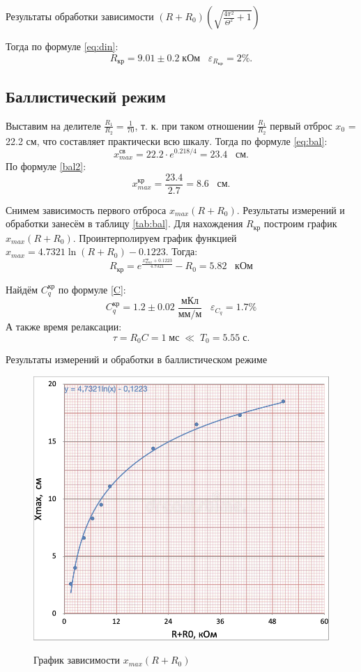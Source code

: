\documentclass[12pt,a4paper]{article}
\begin{document}
\begin{table}[H]
	\caption{Результаты обработки зависимости $(R+R_0)\left(\sqrt{\frac{4\pi^2}{\Theta^2} + 1}\right)$}
	
	\label{table:mnk1}
\end{table}

Тогда по формуле \ref{eq:din}: 
    $$ R_\text{кр} = 9.01 \pm 0.2\; \text{кОм} \;\;\; \varepsilon_{R_\text{кр}} = 2\%. $$


\subsection*{Баллистический режим}

Выставим на делителе $\frac{R_1}{R_2} = \frac{1}{70}$, т. к. при таком отношении $\frac{R_1}{R_2}$ первый отброс $x_0$ = 22.2 см, что составляет практически всю шкалу. Тогда по формуле \ref{eq:bal}:
$$x_{max}^\text{св} = 22.2 \cdot e^{0.218/4} = 23.4 \;\;\; \text{см}.$$
По формуле  \ref{bal2}: $$x_{max}^\text{кр}=\frac{23.4}{2.7}=8.6 \;\;\; \text{см}.$$

Снимем зависимость первого отброса $x_{max}\left(R+R_0\right)$. Результаты измерений и обработки занесём в таблицу \ref{tab:bal}. Для нахождения $R_\text{кр}$ построим график $x_{max}\left(R+R_0\right)$. 
Проинтерполируем график функцией $x_{max}=4.7321 \ln(R+R_0)-0.1223$. Тогда:
$$R_\text{кр}=e^{\frac{x_{max}^\text{кр}+0.1223}{4.7321}}-R_0=5.82 \;\;\; \text{кОм}$$

Найдём $C_q^\text{кр}$ по формуле \ref{C}:
$$C_q^\text{кр} = 1.2 \pm 0.02\; \frac{\text{мКл}}{\text{мм}/\text{м}} \;\;\; \varepsilon_{C_q}= 1.7\%$$
А также время релаксации:
$$\tau = R_0 C = 1 \; \text{мс} \; \ll \; T_0 = 5.55 \; \text{с}.$$


\begin{table}[H]
	\caption{Результаты измерений и обработки в баллистическом режиме}
	
	\label{tab:bal}
\end{table}

\begin{figure}[H]
	\caption{График зависимости $x_{max}\left(R+R_0\right)$}
	\includegraphics[width = 9.8 cm]{src/xRR0.png}
	\label{fig:plt2}
\end{figure}
\end{document}
